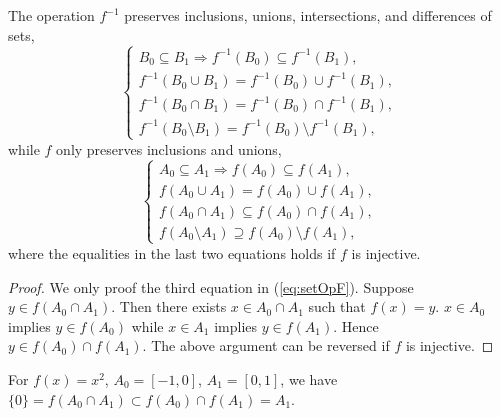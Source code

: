 \begin{lem}
  \label{lem:setOpPreservation}
  The operation $f^{-1}$ preserves inclusions,
  unions, intersections, and differences of sets, 
  \begin{equation}
    \label{eq:setOpFpre}
    \left\{
      \begin{array}{l}
        B_0\subseteq B_1 \Rightarrow f^{-1}(B_0)\subseteq f^{-1}(B_1),
        \\
        f^{-1}(B_0\cup B_1) = f^{-1}(B_0) \cup f^{-1}(B_1),
        \\
        f^{-1}(B_0\cap B_1) = f^{-1}(B_0) \cap f^{-1}(B_1),
        \\
        f^{-1}(B_0\setminus B_1) = f^{-1}(B_0) \setminus f^{-1}(B_1), 
      \end{array}
    \right .
  \end{equation}
  while $f$ only preserves inclusions and unions, 
  \begin{equation}
    \label{eq:setOpF}
    \left\{
      \begin{array}{l}
        A_0\subseteq A_1 \Rightarrow f(A_0)\subseteq f(A_1),
        \\
        f(A_0\cup A_1) = f(A_0) \cup f(A_1),
        \\
        f(A_0\cap A_1) \subseteq f(A_0) \cap f(A_1),
        \\
        f(A_0\setminus A_1) \supseteq f(A_0) \setminus f(A_1),
      \end{array}
    \right .
  \end{equation}
  where the equalities in the last two equations holds
  if $f$ is injective.
\end{lem}
\begin{proof}
  We only proof the third equation in (\ref{eq:setOpF}).
  Suppose $y\in f(A_0\cap A_1)$.
  Then there exists $x\in A_0\cap A_1$ such that $f(x)=y$.
   $x\in A_0$ implies $y\in f(A_0)$
   while $x\in A_1$ implies $y\in f(A_1)$.
  Hence $y\in f(A_0)\cap f(A_1)$.
  The above argument can be reversed if $f$ is injective.
\end{proof}

\begin{exm}
  For $f(x)=x^2$, $A_0=[-1,0]$, $A_1=[0,1]$,
  we have $\{0\}=f(A_0\cap A_1)\subset f(A_0)\cap f(A_1)=A_1$.
\end{exm}


